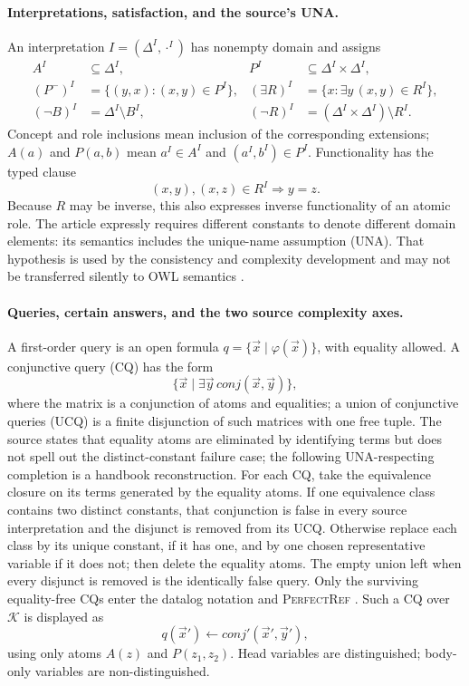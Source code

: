\paragraph{Interpretations, satisfaction, and the source's UNA.}
An interpretation \(I=(\Delta^I,\cdot^I)\) has nonempty domain and assigns
\[
\begin{aligned}
 A^I&\subseteq\Delta^I,&
 P^I&\subseteq\Delta^I\times\Delta^I,\\
 (P^{-})^I&=\{(y,x):(x,y)\in P^I\},&
 (\exists R)^I&=\{x:\exists y\,(x,y)\in R^I\},\\
 (\neg B)^I&=\Delta^I\setminus B^I,&
 (\neg R)^I&=(\Delta^I\times\Delta^I)\setminus R^I.
\end{aligned}
\]
Concept and role inclusions mean inclusion of the corresponding extensions;
\(A(a)\) and \(P(a,b)\) mean \(a^I\in A^I\) and
\((a^I,b^I)\in P^I\).  Functionality has the typed clause
\[
 (x,y),(x,z)\in R^I\Longrightarrow y=z.
\]
Because \(R\) may be inverse, this also expresses inverse functionality of an
atomic role.  The article expressly requires different constants to denote
different domain elements: its semantics includes the unique-name assumption
(UNA).  That hypothesis is used by the consistency and complexity development
and may not be transferred silently to OWL semantics
\cite[pp.~389--392]{CalvaneseEtAl2007}.

\paragraph{Queries, certain answers, and the two source complexity axes.}
A first-order query is an open formula \(q=\{\vec x\mid\varphi(\vec x)\}\),
with equality allowed.  A conjunctive query (CQ) has the form
\[
 \{\vec x\mid\exists\vec y\,
       \mathit{conj}(\vec x,\vec y)\},
\]
where the matrix is a conjunction of atoms and equalities; a union of
conjunctive queries (UCQ) is a finite disjunction of such matrices with one
free tuple.  The source states that equality atoms are eliminated by
identifying terms but does not spell out the distinct-constant failure case;
the following UNA-respecting completion is a handbook reconstruction.  For
each CQ, take the equivalence closure on its terms generated by the equality
atoms.  If one equivalence class contains two distinct constants, that
conjunction is false in every source interpretation and the disjunct is removed
from its UCQ.  Otherwise replace each class by its unique constant, if it has
one, and by one chosen representative variable if it does not; then delete the
equality atoms.  The empty union left when every disjunct is removed is the
identically false query.  Only the surviving equality-free CQs enter the
datalog notation and \textsc{PerfectRef}
\cite[pp.~392--393]{CalvaneseEtAl2007}.  Such a CQ over \(\mathcal K\) is
displayed as
\[
 q(\vec x')\leftarrow\mathit{conj}'(\vec x',\vec y'),
\]
using only atoms \(A(z)\) and \(P(z_1,z_2)\).  Head variables are
distinguished; body-only variables are non-distinguished.

